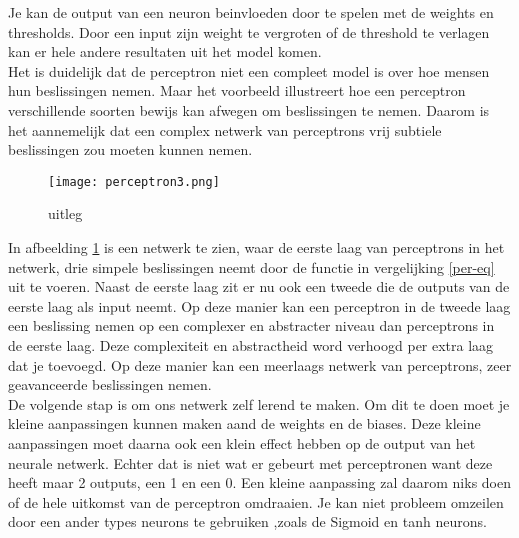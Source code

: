 \noindent Je kan de output van een neuron beinvloeden door te spelen met de weights en thresholds. Door een input zijn weight te vergroten of de threshold te verlagen kan er hele andere resultaten uit het model komen.\\
\newline
Het is duidelijk dat de perceptron niet een compleet model is over hoe mensen hun beslissingen nemen. Maar het voorbeeld illustreert hoe een perceptron verschillende soorten bewijs kan afwegen om beslissingen te nemen. Daarom is het aannemelijk dat een complex netwerk van perceptrons vrij subtiele beslissingen zou moeten kunnen nemen.
\begin{figure}[h!]
\centering
\texttt{[image: perceptron3.png]}
\caption{uitleg}
\label{perceptron3}
\end{figure}
\newline
In afbeelding \ref{perceptron3} is een netwerk te zien, waar de eerste laag van perceptrons in het netwerk, drie simpele beslissingen neemt door de functie in vergelijking \ref{per-eq} uit te voeren. Naast de eerste laag zit er nu ook een tweede die de outputs van de eerste laag als input neemt. Op deze manier kan een perceptron in de tweede laag een beslissing nemen op een complexer en abstracter niveau dan perceptrons in de eerste laag. Deze complexiteit en abstractheid word verhoogd per extra laag dat je toevoegd. Op deze manier kan een meerlaags netwerk van perceptrons, zeer geavanceerde beslissingen nemen.\\
\newline
De volgende stap is om ons netwerk zelf lerend te maken. Om dit te doen moet je kleine aanpassingen kunnen maken aand de weights en de biases. Deze kleine aanpassingen moet daarna ook een klein effect hebben op de output van het neurale netwerk. Echter dat is niet wat er gebeurt met perceptronen want deze heeft maar 2 outputs, een 1 en een 0. Een kleine aanpassing zal daarom niks doen of de hele uitkomst van de perceptron omdraaien. Je kan niet probleem omzeilen door een ander types neurons te gebruiken ,zoals de Sigmoid en tanh neurons.

